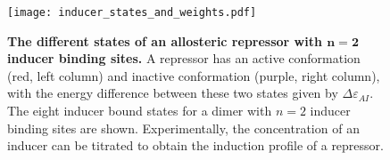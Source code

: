 \begin{figure}[h]
	\centering \texttt{[image: inducer\_states\_and\_weights.pdf]}
	\caption{{\bf The different states of an allosteric repressor with
			$\boldsymbol{n=2}$ inducer binding sites.}   A
		repressor has an active conformation (red, left column) and inactive
		conformation (purple, right column), with the energy difference between these
		two states given by $\Delta \varepsilon_{AI}$. The eight inducer bound states
		for a dimer with $n=2$ inducer binding sites are shown. 
		 Experimentally, the
		concentration of an inducer can be titrated to obtain the induction profile of
		a repressor. } \label{figrepressorInducerStates}
\end{figure}

